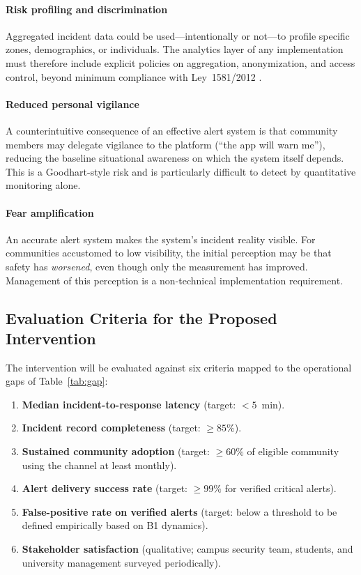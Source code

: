 \documentclass[conference]{IEEEtran}
\begin{document}
\paragraph{Risk profiling and discrimination}
Aggregated incident data could be used---intentionally or not---to
profile specific zones, demographics, or individuals. The analytics
layer of any implementation must therefore include explicit policies
on aggregation, anonymization, and access control, beyond minimum
compliance with Ley~1581/2012 \cite{ley1581}.

\paragraph{Reduced personal vigilance}
A counterintuitive consequence of an effective alert system is that
community members may delegate vigilance to the platform (``the app
will warn me''), reducing the baseline situational awareness on which
the system itself depends. This is a Goodhart-style risk and is
particularly difficult to detect by quantitative monitoring alone.

\paragraph{Fear amplification}
An accurate alert system makes the system's incident reality visible.
For communities accustomed to low visibility, the initial perception
may be that safety has \emph{worsened}, even though only the
measurement has improved. Management of this perception is a
non-technical implementation requirement.

\subsection{Evaluation Criteria for the Proposed Intervention}
\label{sec:criteria}
The intervention will be evaluated against six criteria mapped to
the operational gaps of Table~\ref{tab:gap}:

\begin{enumerate}[leftmargin=*,itemsep=2pt]
\item \textbf{Median incident-to-response latency} (target: \(< 5\)~min).
\item \textbf{Incident record completeness} (target: \(\geq 85\%\)).
\item \textbf{Sustained community adoption} (target: \(\geq 60\%\) of
      eligible community using the channel at least monthly).
\item \textbf{Alert delivery success rate} (target: \(\geq 99\%\) for
      verified critical alerts).
\item \textbf{False-positive rate on verified alerts} (target: below
      a threshold to be defined empirically based on B1 dynamics).
\item \textbf{Stakeholder satisfaction} (qualitative; campus security
      team, students, and university management surveyed periodically).
\end{enumerate}
\end{document}
